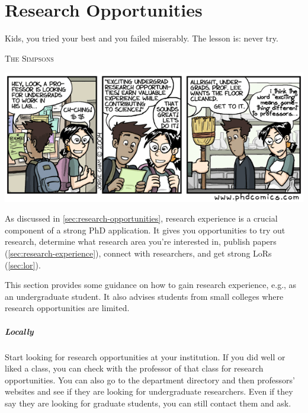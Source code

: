 \documentclass[oneside,11pt,dvipsnames]{book}
\newenvironment{domesticbox}[1][]{
  \small
  \begin{mydomesticbox}
    {\small \textbf{#1}}
  }{
  \end{mydomesticbox}
}
\begin{document}

\chapter{Research Opportunities}\label{sec:research-opportunities}

\epigraph{\vspace{-0.2in} Kids, you tried your best and you failed miserably. The lesson is: never try.}{\textsc{The Simpsons}}



\begin{center}
    \includegraphics[scale=0.5]{files/phd100404s.png}
  \end{center}

As discussed in \autoref{sec:research-opportunities}, research experience is a crucial component of a strong PhD application. It gives you opportunities to try out research, determine what research area you're interested in, publish papers (\autoref{sec:research-experience}), connect with researchers, and get strong LoRs (\autoref{sec:lor}).

 This section provides some guidance on how to gain research experience, e.g., as an undergraduate student.  It also advises students from small colleges where research opportunities are limited.

\paragraph{Locally} Start looking for research opportunities at your institution.
If you did well or liked a class, you can check with the professor of that class for research opportunities.
You can also go to the department directory and then professors' websites and see if they are looking for undergraduate researchers.
Even if they say they are looking for graduate students, you can still contact them and ask.
\end{document}
